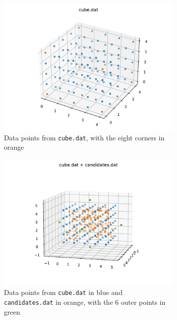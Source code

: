 \documentclass{article}
\begin{document}
\begin{figure}
    \begin{subfigure}{0.49\linewidth}
        \centering
        \includegraphics[width=\textwidth]{cube.pdf}
        \caption{Data points from \texttt{cube.dat}, with the eight corners in orange}
        \label{fig:cube}
    \end{subfigure}
    \begin{subfigure}{0.49\linewidth}
        \centering
        \includegraphics[width=\textwidth]{candidates.pdf}
        \caption{Data points from \texttt{cube.dat} in blue and \texttt{candidates.dat} in orange, with the 6 outer points in green}
        \label{fig:candidates}
    \end{subfigure}
    \caption{}
\end{figure}
\end{document}
